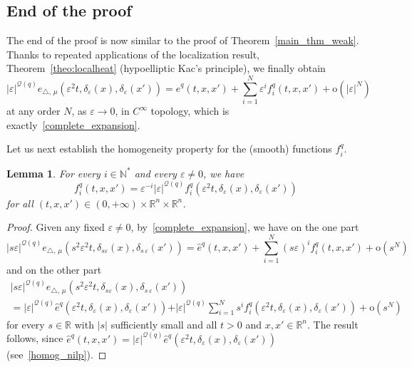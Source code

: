 \documentclass[10pt]{amsart}
\newtheorem{lemm}[theo]{Lemma}\newtheorem{prop}[theo]{Proposition}\newtheorem{coro}[theo]{Corollary}\newtheorem{conj}[theo]{Conjecture}
\theoremstyle{definition}\newtheorem{defi}[theo]{Definition}\newtheorem{rema}[theo]{Remark}\newtheorem{exam}[theo]{Example}\newtheorem{exem}[theo]{Example}\newtheorem{nota}[theo]{Notation}
\newcommand*\R{\mathbb{R}}
\newcommand*\N{\mathbb{N}}
\newcommand{\calQ}{\mathcal{Q}}
\newcommand{\rmo}{\mathrm{o}}
\begin{document}
\subsection{End of the proof}\label{end_of_the_proof_main_thm}
The end of the proof is now similar to the proof of Theorem~\ref{main_thm_weak}. Thanks to repeated applications of the localization result, Theorem~\ref{theo:localheat} (hypoelliptic Kac's principle), we finally obtain
\[
\vert\varepsilon\vert^{\calQ(q)} e_{\triangle,\,\mu}\left(\varepsilon^2t,\delta_\varepsilon(x),\delta_\varepsilon(x')\right) = \widehat{e}^{q}(t,x,x') + \sum_{i=1}^N \varepsilon^i f_i^{q}(t,x,x') +\rmo\left(\vert\varepsilon\vert^N\right)
\]
at any order $N$, as $\varepsilon\rightarrow 0$, in $C^\infty$ topology, which is exactly~\eqref{complete_expansion}.

Let us next establish the homogeneity property for the (smooth) functions $f^{q}_i$.

\begin{lemm}\label{lem_fi}
For every $i\in\N^*$ and every $\varepsilon\neq 0$, we have
\[
f^{q}_i(t,x,x') = \varepsilon^{-i} \vert\varepsilon\vert^{\calQ(q)} f^{q}_i\left(\varepsilon^2 t,\delta_\varepsilon(x),\delta_\varepsilon(x')\right)
\]
for all $(t,x,x')\in(0,+\infty)\times\R^n\times\R^n$.
\end{lemm}

\begin{proof}
Given any fixed $\varepsilon\neq 0$, by~\eqref{complete_expansion}, we have on the one part
\[
\vert s\varepsilon\vert^{\calQ(q)} e_{\triangle,\,\mu} \left(s^2\varepsilon^2 t, \delta_{s\varepsilon}(x), \delta_{s\,\varepsilon}(x')\right) = \widehat{e}^{q}(t,x,x') + \sum_{i=1}^N (s\varepsilon)^i f^{q}_i(t,x,x') +\rmo\left(s^N\right)
\]
and on the other part
\begin{multline*}
\vert s\varepsilon\vert^{\calQ(q)} e_{\triangle,\,\mu} \left(s^2\varepsilon^2 t, \delta_{s\varepsilon}(x), \delta_{s\,\varepsilon}(x')\right)\\
 = \vert \varepsilon\vert^{\calQ(q)} \widehat{e}^{q}\left(\varepsilon^2 t,\delta_\varepsilon(x),\delta_\varepsilon(x')\right) 
+ \vert \varepsilon\vert^{\calQ(q)} \sum_{i=1}^N s^i f^{q}_i\left(\varepsilon^2 t,\delta_\varepsilon(x),\delta_\varepsilon(x')\right) +\rmo\left(s^N\right)
\end{multline*}
for every $s\in\R$ with $\vert s\vert$ sufficiently small and all $t>0$ and $x,x'\in\R^n$. The result follows, since $\widehat{e}^{q}(t,x,x') = \vert \varepsilon\vert^{\calQ(q)} \widehat{e}^{q}(\varepsilon^2 t,\delta_\varepsilon(x),\delta_\varepsilon(x'))$ (see~\eqref{homog_nilp}).
\end{proof}
\end{document}
